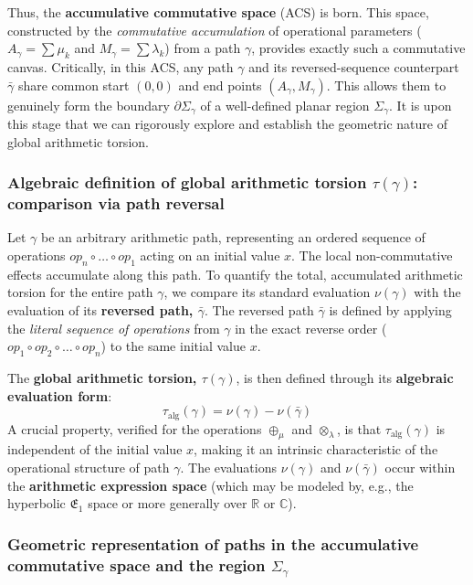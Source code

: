 Thus, the \textbf{accumulative commutative space} (ACS) is born. This space, constructed by the \textit{commutative accumulation} of operational parameters ($A_\gamma = \sum \mu_k$ and $M_\gamma = \sum \lambda_k$) from a path $\gamma$, provides exactly such a commutative canvas. Critically, in this ACS, any path $\gamma$ and its reversed-sequence counterpart $\bar{\gamma}$ share common start $(0,0)$ and end points $(A_\gamma, M_\gamma)$. This allows them to genuinely form the boundary $\partial\Sigma_\gamma$ of a well-defined planar region $\Sigma_\gamma$. It is upon this stage that we can rigorously explore and establish the geometric nature of global arithmetic torsion.

\subsubsection*{Algebraic definition of global arithmetic torsion $\tau(\gamma)$: comparison via path reversal}

Let $\gamma$ be an arbitrary arithmetic path, representing an ordered sequence of operations $op_n \circ \dots \circ op_1$ acting on an initial value $x$. The local non-commutative effects accumulate along this path. To quantify the total, accumulated arithmetic torsion for the entire path $\gamma$, we compare its standard evaluation $\nu(\gamma)$ with the evaluation of its \textbf{reversed path, $\bar{\gamma}$}. The reversed path $\bar{\gamma}$ is defined by applying the \textit{literal sequence of operations} from $\gamma$ in the exact reverse order ($op_1 \circ op_2 \circ \dots \circ op_n$) to the same initial value $x$.

The \textbf{global arithmetic torsion, $\tau(\gamma)$}, is then defined through its \textbf{algebraic evaluation form}:
\begin{equation}
\tau_{\text{alg}}(\gamma) = \nu(\gamma) - \nu(\bar{\gamma})
\label{eq:T_alg_formal_final_narrative_enhanced_acs_AM_lc}
\end{equation}
A crucial property, verified for the operations $\oplus_\mu$ and $\otimes_\lambda$, is that $\tau_{\text{alg}}(\gamma)$ is independent of the initial value $x$, making it an intrinsic characteristic of the operational structure of path $\gamma$. The evaluations $\nu(\gamma)$ and $\nu(\bar{\gamma})$ occur within the \textbf{arithmetic expression space} (which may be modeled by, e.g., the hyperbolic $\mathfrak{E}_1$ space or more generally over $\mathbb{R}$ or $\mathbb{C}$).

\subsubsection*{Geometric representation of paths in the accumulative commutative space and the region $\Sigma_\gamma$}

